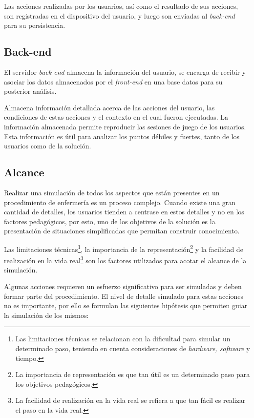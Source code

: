 Las acciones realizadas por los usuarios, así como el resultado de sus acciones,
son registradas en el dispositivo del usuario, y luego son enviadas al
\textit{back-end} para su persistencia.

\subsection{Back-end}

El servidor \textit{back-end} almacena la información del usuario, se encarga
de recibir y asociar los datos almacenados por el \textit{front-end} en una
base datos para su posterior análisis.


Almacena información detallada acerca de las acciones del usuario,
las condiciones de estas acciones y el contexto en el cual fueron ejecutadas.
La información almacenada permite reproducir las sesiones de juego
de los usuarios. Esta información es útil para analizar los puntos débiles y
fuertes, tanto de los usuarios como de la solución.

\subsection{Alcance}

Realizar una simulación de todos los aspectos que están presentes en un
procedimiento de enfermería es un proceso complejo. Cuando existe una gran
cantidad de detalles, los usuarios tienden a centrase en estos detalles y no en
los factores pedagógicos\cite{videojuegos:gonzaleztardon}, por esto, uno de los
objetivos de la solución es la presentación de situaciones simplificadas que
permitan construir conocimiento.

Las limitaciones técnicas\footnote{Las limitaciones técnicas se relacionan con
    la dificultad para simular un determinado paso, teniendo en cuenta
    consideraciones de \textit{hardware, software} y tiempo.}, la importancia de
la representación\footnote{La importancia de representación es que tan útil es
    un determinado paso para los objetivos pedagógicos.} y la facilidad de
realización en la vida real\footnote{La facilidad de realización en la vida real
    se refiera a que tan fácil es realizar el paso en la vida real.} son los
factores utilizados para acotar el alcance de la simulación.

Algunas acciones requieren un esfuerzo significativo para ser simuladas y deben
formar parte del procedimiento. El nivel de detalle simulado para estas acciones
no es importante, por ello se formulan las siguientes hipótesis que permiten
guiar la simulación de los mismos:


